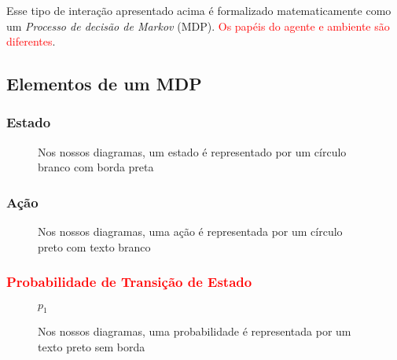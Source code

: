\documentclass{article}
\begin{document}
        Esse tipo de interação apresentado acima é formalizado matematicamente como um \emph{Processo de decisão de Markov} (MDP). \textcolor{red}{Os papéis do agente e ambiente são diferentes}.
    
        \subsection{Elementos de um MDP}
    
            \subsubsection{Estado}
            
                \begin{figure}[ht]
                    \centering
                    \caption{Nos nossos diagramas, um estado é representado por um círculo branco com borda preta}
                    \label{diag:state-node}
                \end{figure}
                
            \subsubsection{Ação}
            
                \begin{figure}[ht]
                    \centering
                    \caption{Nos nossos diagramas, uma ação é representada por um círculo preto com texto branco}
                    \label{diag:action-node}
                \end{figure}
                
            \subsubsection{\textcolor{red}{Probabilidade de Transição de Estado}}
            
                \begin{figure}[ht]
                    \centering
                    $p_1$\\
                    \caption{Nos nossos diagramas, uma probabilidade é representada por um texto preto sem borda}
                    \label{diag:prob-label}
                \end{figure}
            
\end{document}

